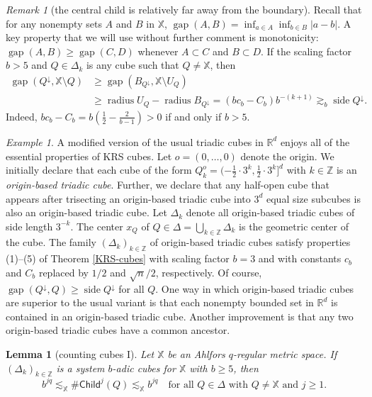 \documentclass[12pt]{amsart}
\newtheorem{lemma}[theorem]{Lemma}
\theoremstyle{definition}
\theoremstyle{remark}
\newtheorem{remark}[theorem]{Remark}
\newtheorem{example}[theorem]{Example}
\newcommand{\RR}{\mathbb{R}}
\newcommand{\ZZ}{\mathbb{Z}}
\newcommand{\XX}{\mathbb{X}}
\newcommand{\side}{\mathop\mathrm{side}\nolimits}
\newcommand{\gap}{\mathop\mathrm{gap}\nolimits}
\newcommand{\Child}{\mathsf{Child}}
\newcommand{\radius}{\mathop\mathrm{radius}\nolimits}
\numberwithin{figure}{section}
\numberwithin{equation}{section}
\begin{document}
\begin{remark}[the central child is relatively far away from the boundary] \label{r:central} Recall that for any nonempty sets $A$ and $B$ in $\XX$, $\gap(A,B)=\inf_{a\in A}\inf_{b\in B}|a-b|$. A key property that we will use without further comment is monotonicity: $\gap(A,B)\geq \gap(C,D)$ whenever $A\subset C$ and $B\subset D$. If the scaling factor $b>5$ and $Q\in\Delta_k$ is any cube such that $Q\neq \XX$, then \begin{equation}\begin{split} \label{b-gap} \gap(Q^{\downarrow},\XX\setminus Q)&\geq \gap(B_{Q^\downarrow},\XX\setminus U_Q)\\
&\geq \radius U_{Q}-\radius B_{Q^\downarrow} =(bc_b-C_b)b^{-(k+1)}\gtrsim_b \side Q^\downarrow.\end{split}\end{equation} Indeed, $bc_b-C_b=b(\frac{1}{2}-\frac{2}{b-1})>0$ if and only if $b>5$.
\end{remark}

\begin{example} A modified version of the usual triadic cubes in $\RR^d$ enjoys all of the essential properties of KRS cubes. Let $o=(0,\dots,0)$ denote the origin. We initially declare that each cube of the form $Q_k^o=(-\frac{1}{2}\cdot 3^k,\frac12\cdot 3^k]^d$ with $k\in\ZZ$ is an \emph{origin-based triadic cube}. Further, we declare that any half-open cube that appears after trisecting an origin-based triadic cube into $3^d$ equal size subcubes is also an origin-based triadic cube. Let $\Delta_k$ denote all origin-based triadic cubes of side length $3^{-k}$. The center $x_Q$ of $Q\in\Delta=\bigcup_{k\in\ZZ}\Delta_k$ is the geometric center of the cube. The family $(\Delta_k)_{k\in\ZZ}$ of origin-based triadic cubes satisfy properties (1)--(5) of Theorem \ref{KRS-cubes} with scaling factor $b=3$ and with constants $c_b$ and $C_b$ replaced by $1/2$ and $\sqrt{n}/2$, respectively. Of course, $\gap(Q^\downarrow,Q)\geq \side Q^\downarrow$ for all $Q$. One way in which origin-based triadic cubes are superior to the usual variant is that each nonempty bounded set in $\RR^d$ is contained in an origin-based triadic cube. Another improvement is that any two origin-based triadic cubes have a common ancestor.
\end{example}

\begin{lemma}[counting cubes I]\label{l:AR-count}
Let $\XX$ be an Ahlfors $q$-regular metric space. If $(\Delta_k)_{k\in\ZZ}$ is a system $b$-adic cubes for $\XX$ with $b\geq 5$, then \begin{equation}\label{e:AR-count-X} b^{jq}\lesssim_\XX \#\Child^j(Q) \lesssim_\XX b^{jq}\quad\text{for all $Q\in\Delta$ with $Q\neq\XX$ and $j\geq 1$.}\end{equation}
\end{lemma}
\end{document}
